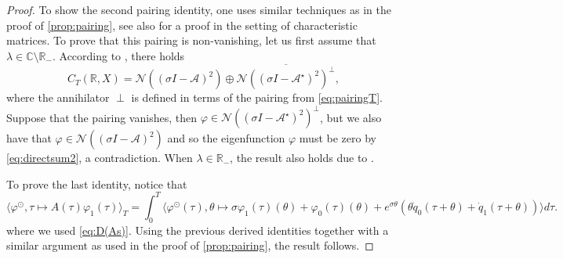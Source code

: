 \documentclass[english]{myarticle}
\begin{document}
\begin{sloppypar}
\begin{proposition}
\begin{proof}
To show the second pairing identity, one uses similar techniques as in the proof of \cref{prop:pairing}, see also \cite[Lemma 2.7]{Janssens2010} for a proof in the setting of characteristic matrices. To prove that this pairing is non-vanishing, let us first assume that $\lambda \in \mathbb{C} \setminus \mathbb{R}_{-}$. According to \cite[Corollary 25]{Article1}, there holds
\begin{equation} \label{eq:directsum2}
    C_T(\mathbb{R},X) = \mathcal{N}((\sigma I - \mathcal{A})^2) \oplus \overline{\mathcal{N}((\sigma I -\mathcal{A}^\star)^2)^{\perp}},
\end{equation}
where the annihilator $\perp$ is defined in terms of the pairing from \eqref{eq:pairingT}. Suppose that the pairing vanishes, then $\varphi \in \mathcal{N}((\sigma I - \mathcal{A}^\star)^2)^\perp$, but we also have that $\varphi \in \mathcal{N}((\sigma I - \mathcal{A})^2)$ and so the eigenfunction $\varphi$ must be zero by \eqref{eq:directsum2}, a contradiction. When $\lambda \in \mathbb{R}_{-}$, the result also holds due to \cite[Remark 25]{Article1}.

To prove the last identity, notice that
\begin{equation*}
    \langle \varphi^\odot,\tau \mapsto A(\tau)\varphi_1(\tau) \rangle_T = \int_0^T \langle \varphi^\odot(\tau), \theta \mapsto \sigma \varphi_1(\tau)(\theta) + \varphi_0(\tau)(\theta) + e^{\sigma \theta}(\theta \dot{q}_0(\tau + \theta) + \dot{q}_1(\tau + \theta)) \rangle d\tau.
\end{equation*}
where we used \eqref{eq:D(As)}. Using the previous derived identities together with a similar argument as used in the proof of \cref{prop:pairing}, the result follows.
\end{proof}
\end{proposition}


\end{sloppypar}
\end{document}
